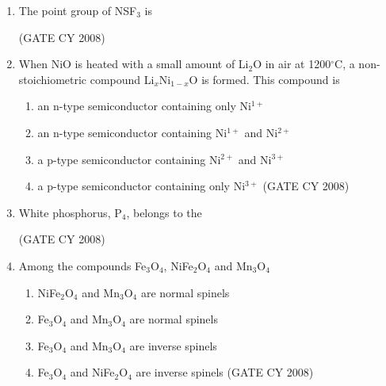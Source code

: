 \documentclass[12pt]{article}
\begin{document}
\begin{enumerate}
\item The point group of NSF$_3$ is
\begin{enumerate}
    \hfill{(GATE CY 2008)}
\end{enumerate}

\item When NiO is heated with a small amount of Li$_2$O in air at 1200$^\circ$C, a non-stoichiometric compound Li$_x$Ni$_{1-x}$O is formed. This compound is
\begin{enumerate}
\item  an n-type semiconductor containing only Ni$^{1+}$
\item an n-type semiconductor containing Ni$^{1+}$ and Ni$^{2+}$
\item a p-type semiconductor containing Ni$^{2+}$ and Ni$^{3+}$
\item a p-type semiconductor containing only Ni$^{3+}$    \hfill{(GATE CY 2008)}
\end{enumerate}
\degree




\item White phosphorus, P$_4$, belongs to the
\begin{enumerate}
  \hfill{(GATE CY 2008)}
\end{enumerate}

\item Among the compounds Fe$_3$O$_4$, NiFe$_2$O$_4$ and Mn$_3$O$_4$
\begin{enumerate}
\item NiFe$_2$O$_4$ and Mn$_3$O$_4$ are normal spinels
\item Fe$_3$O$_4$ and Mn$_3$O$_4$ are normal spinels
\item Fe$_3$O$_4$ and Mn$_3$O$_4$ are inverse spinels
\item Fe$_3$O$_4$ and NiFe$_2$O$_4$ are inverse spinels    \hfill{(GATE CY 2008)}
\end{enumerate}


\end{enumerate}
\end{document}
